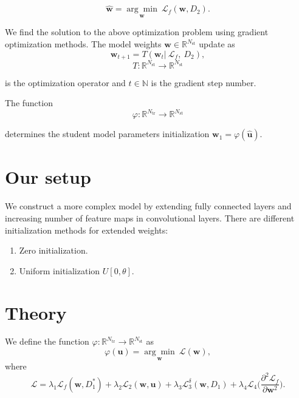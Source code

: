 \documentclass[80pt]{article}
\begin{document}
$$\hat{\mathbf{w}} =  \underset{\mathbf{w}}{\arg\min}~\mathcal{L}_f(\mathbf{w}, D_2).$$

We find the solution to the above optimization problem using gradient optimization methods. The model weights $\mathbf{w} \in \mathbb{R}^{N_{\text{st}}}$ update as
\[\mathbf{w}_{t+1} = T(\mathbf{w}_t |~\mathcal{L}_f,~D_2),\]
\[T: \mathbb{R}^{N_\text{st}} \rightarrow \mathbb{R}^{N_\text{st}}\]

is the optimization operator and $t \in \mathbb{N}$ is the gradient step number.

The function 
\[\varphi: \mathbb{R}^{N_\text{tr}} \rightarrow \mathbb{R}^{N_\text{st}}\]

determines the student model parameters initialization $\mathbf{w}_1 = \varphi(\hat{\mathbf{u}})$.

\section{Our setup}
\label{sec:setup}

We construct a more complex model by extending fully connected layers and increasing number of feature maps in convolutional layers. There are different initialization methods for extended weights:

\begin{enumerate}
    \item Zero initialization.
    \item Uniform initialization $U[0, \theta]$.
\end{enumerate}

\section{Theory}

We define the function $\varphi: \mathbb{R}^{N_\text{tr}} \rightarrow \mathbb{R}^{N_\text{st}}$ as
$$\varphi(\mathbf{u}) = \underset{\mathbf{w}}{\arg\min}~\mathcal{L}(\mathbf{w}),$$
where \[\mathcal{L} = \lambda_1 \mathcal{L}_f(\mathbf{w}, D_1^*) + \lambda_2 \mathcal{L}_2 (\mathbf{w}, \mathbf{u}) + \lambda_3 \mathcal{L}_3^\delta (\mathbf{w}, D_1) + \lambda_4 \mathcal{L}_4 \bigl(\displaystyle \frac{\partial^2 \mathcal{L}_f}{\partial \mathbf{w}^2}\bigr).\]
\end{document}
